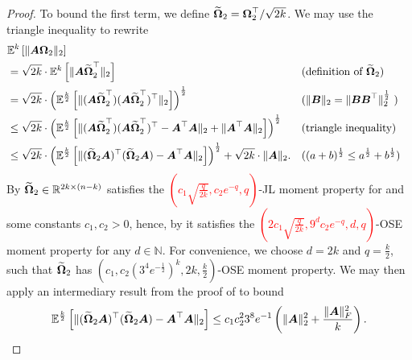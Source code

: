 \documentclass[12pt]{article}
\begin{document}
\begin{proof}
    To bound the first term, we define $\widetilde{\boldsymbol{\Omega}}_2 = \boldsymbol{\Omega}_2^{\top} / \sqrt{2k}$. We may use the triangle inequality to rewrite
    \begin{align}
        &\mathbb{E}^{k}\left[ \lVert \boldsymbol{A} \boldsymbol{\Omega}_2 \rVert _2 \right] \notag \\
        &= \sqrt{2k} \cdot \mathbb{E}^{k}\left[ \lVert \boldsymbol{A} \widetilde{\boldsymbol{\Omega}}_2^{\top} \rVert _2 \right] && \text{(definition of $\widetilde{\boldsymbol{\Omega}}_2$)} \notag \\
        &= \sqrt{2k} \cdot \left(\mathbb{E}^{\frac{k}{2}}\left[ \lVert (\boldsymbol{A} \widetilde{\boldsymbol{\Omega}}_2^{\top}) (\boldsymbol{A} \widetilde{\boldsymbol{\Omega}}_2^{\top})^{\top} \rVert _2 \right]\right)^{\frac{1}{2}} && \text{($\lVert \boldsymbol{B} \rVert _2 = \lVert \boldsymbol{B} \boldsymbol{B}^{\top} \rVert _2^{\frac{1}{2}} $ )} \notag \\
        &\leq \sqrt{2k} \cdot \left( \mathbb{E}^{\frac{k}{2}}\left[ \lVert (\boldsymbol{A} \widetilde{\boldsymbol{\Omega}}_2^{\top}) (\boldsymbol{A} \widetilde{\boldsymbol{\Omega}}_2^{\top})^{\top} - \boldsymbol{A}^{\top} \boldsymbol{A} \rVert _2 + \lVert \boldsymbol{A}^{\top} \boldsymbol{A} \rVert _2 \right]\right)^{\frac{1}{2}} && \text{(triangle inequality)} \notag \\
        &\leq \sqrt{2k} \cdot \left( \mathbb{E}^{\frac{k}{2}}\left[ \lVert (\widetilde{\boldsymbol{\Omega}}_2 \boldsymbol{A} )^{\top} (\widetilde{\boldsymbol{\Omega}}_2 \boldsymbol{A}) - \boldsymbol{A}^{\top} \boldsymbol{A} \rVert _2\right]\right)^{\frac{1}{2}} + \sqrt{2k} \cdot \lVert \boldsymbol{A} \rVert _2. && \text{($(a+b)^{\frac{1}{2}} \leq a^{\frac{1}{2}} + b^{\frac{1}{2}}$)}
    \end{align}
    By \cite{} $\widetilde{\boldsymbol{\Omega}}_2 \in \mathbb{R}^{2k \times (n - k)}$ satisfies the \textcolor{red}{$(c_1 \sqrt{\frac{q}{2k}}, c_2 e^{-q}, q)$}-JL moment property for  and some constants $c_1, c_2 > 0$, hence, by \cite[Lemma 4]{cohen-2016-optimal-approximate} it satisfies the \textcolor{red}{$(2 c_1 \sqrt{\frac{q}{2k}}, 9^d c_2 e^{-q}, d, q)$}-OSE moment property for any $d \in \mathbb{N}$. For convenience, we choose $d=2k$ and $q=\frac{k}{2}$, such that $\widetilde{\boldsymbol{\Omega}}_2$ has $(c_1, c_2 (3^4e^{-\frac{1}{2}})^k, 2k, \frac{k}{2})$-OSE moment property. We may then apply an intermediary result from the proof of \cite[Theorem 1]{cohen-2016-optimal-approximate} to bound
    \begin{equation}
        \mathbb{E}^{\frac{k}{2}}\left[ \lVert (\widetilde{\mtx{\Omega}}_2 \mtx{A} )^{\top} (\widetilde{\mtx{\Omega}}_2 \mtx{A}) - \mtx{A}^{\top} \mtx{A} \rVert _2\right] \leq c_1 c_2^2 3^8e^{-1} \left( \lVert \mtx{A} \rVert _2^2 + \frac{\lVert \mtx{A} \rVert _F^2}{k} \right).

\end{equation}
\end{proof}
\end{document}
